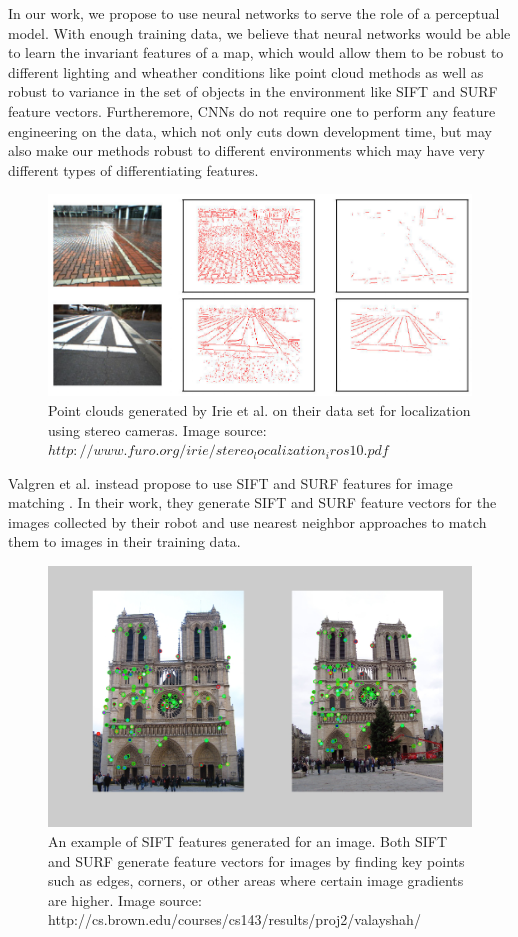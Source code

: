 \documentclass[letterpaper, 12 pt, conference]{ieeeconf}  %
\begin{document}
\par
In our work, we propose to use neural networks to serve the role of a perceptual model. With enough training data, we believe that neural networks would be able to learn the invariant features of a map, which would allow them to be robust to different lighting and wheather conditions like point cloud methods as well as robust to variance in the set of objects in the environment like SIFT and SURF feature vectors. Furtheremore, CNNs do not require one to perform any feature engineering on the data, which not only cuts down development time, but may also make our methods robust to different environments which may have very different types of differentiating features. 
\begin{figure}[h]
\centering
\includegraphics[scale=0.25]{point_clouds}
\caption{Point clouds generated by Irie et al. on their data set for localization using stereo cameras. Image source: $http://www.furo.org/irie/stereo_localization_iros10.pdf$}
\end{figure}

Valgren et al. instead propose to use SIFT and SURF features for image matching \cite{valgren2007sift}. In their work, they generate SIFT \cite{sift} and SURF\cite{surf} feature vectors for the images collected by their robot and use nearest neighbor approaches to match them to images in their training data. 

\begin{figure}[h]
\centering
\includegraphics[scale=0.15]{sift}
\caption{An example of SIFT features generated for an image. Both SIFT and SURF generate feature vectors for images by finding key points such as edges, corners, or other areas where certain image gradients are higher. Image source: http://cs.brown.edu/courses/cs143/results/proj2/valayshah/}
\end{figure}
\end{document}
